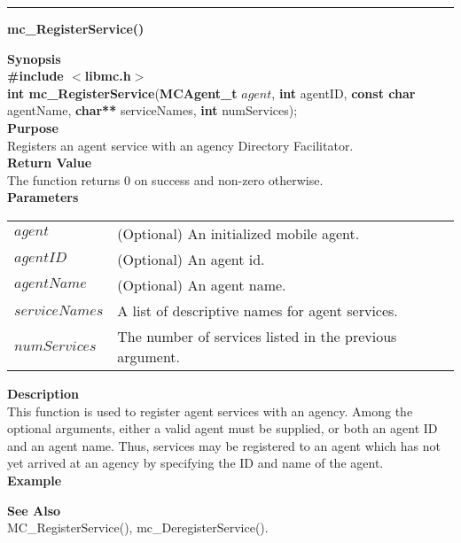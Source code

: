 \noindent
\vspace{5pt}
\rule{6.5in}{0.015in}
\noindent
{}
{\LARGE \bf mc\_RegisterService()}\\
\label{api:mc_RegisterService()}

\noindent
{\bf Synopsis}\\
{\bf \#include $<$libmc.h$>$}\\
{\bf int mc\_RegisterService}({\bf MCAgent\_t} $agent$, {\bf int} agentID, {\bf const char} agentName, {\bf char**} serviceNames, {\bf int} numServices);\\

\noindent
{\bf Purpose}\\
Registers an agent service with an agency Directory Facilitator.\\

\noindent
{\bf Return Value}\\
The function returns 0 on success and non-zero otherwise.\\

\noindent
{\bf Parameters}
\vspace{-0.1in}
\begin{description}
\item
\begin{tabular}{p{23 mm}p{145 mm}} 
$agent$ & (Optional) An initialized mobile agent. \\
$agentID$ & (Optional) An agent id. \\
$agentName$ & (Optional) An agent name. \\
$serviceNames$ & A list of descriptive names for agent services. \\
$numServices$ & The number of services listed in the previous argument.
\end{tabular}
\end{description}

\noindent
{\bf Description}\\
This function is used to register agent services with an agency. Among
the optional arguments, either a valid agent must be supplied, or both
an agent ID and an agent name. Thus, services may be registered to an
agent which has not yet arrived at an agency by specifying the ID and name
of the agent.\\

\noindent
{\bf Example}\\
\noindent
{\footnotesize}

\noindent
{\bf See Also}\\
MC\_RegisterService(), mc\_DeregisterService().

